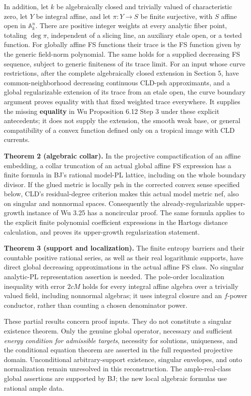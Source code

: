 \documentclass[
  10pt,
]{article}
\begin{document}
In addition, let \(k\) be algebraically closed and trivially valued of
characteristic zero, let \(Y\) be integral affine, and let
\(\pi:Y\to S\) be finite surjective, with \(S\) affine open in
\(\mathbb A_k^n\). There are positive integer weights at every analytic
fiber point, totaling \(\deg\pi\), independent of a slicing line, an
auxiliary etale open, or a tested function. For globally affine FS
functions their trace is the FS function given by the generic field-norm
polynomial. The same holds for a supplied decreasing FS sequence,
subject to generic finiteness of its trace limit. For an input whose
curve restrictions, after the complete algebraically closed extension in
Section 5, have common-neighborhood decreasing continuous CLD-psh
approximants, and a global regularizable extension of its trace from an
etale open, the curve boundary argument proves equality with that fixed
weighted trace everywhere. It supplies the missing \textbf{equality} in
Wu Proposition 6.12 Step 3 under these explicit antecedents; it does not
supply the extension, the smooth weak base, or general compatibility of
a convex function defined only on a tropical image with CLD currents.

\textbf{Theorem 2 (algebraic collar).} In the projective
compactification of an affine embedding, a collar truncation of an
actual global affine FS expression has a finite formula in BJ's rational
model-PL lattice, including on the whole boundary divisor. If the glued
metric is locally psh in the corrected convex sense specified below,
CLD's residual-degree criterion makes this actual model metric nef, also
on singular and nonnormal spaces. Consequently the already-regularizable
upper-growth instance of Wu 3.25 has a noncircular proof. The same
formula applies to the explicit finite polynomial coefficient
expressions in the Hartogs distance calculation, and proves its
upper-growth regularization statement.

\textbf{Theorem 3 (support and localization).} The finite entropy
barriers and their countable positive rational series, as well as their
real logarithmic supports, have direct global decreasing approximations
in the actual affine FS class. No singular analytic-PL representation
assertion is needed. The pole-order localization inequality with error
\(2cM\) holds for every integral affine algebra over a trivially valued
field, including nonnormal algebras; it uses integral closure and an
\(f\)-power conductor, rather than counting a chosen denominator power.

These partial results concern proof inputs. They do not constitute a
singular existence theorem. Only the genuine global operator, necessary
and sufficient \emph{energy condition for admissible targets}, necessity
for solutions, uniqueness, and the conditional equation theorem are
asserted in the full requested projective domain. Unconditional
arbitrary-support existence, singular envelopes, and onto normalization
remain unresolved in this reconstruction. The ample-real-class global
assertions are supported by BJ; the new local algebraic formulas use
rational ample data.
\end{document}
